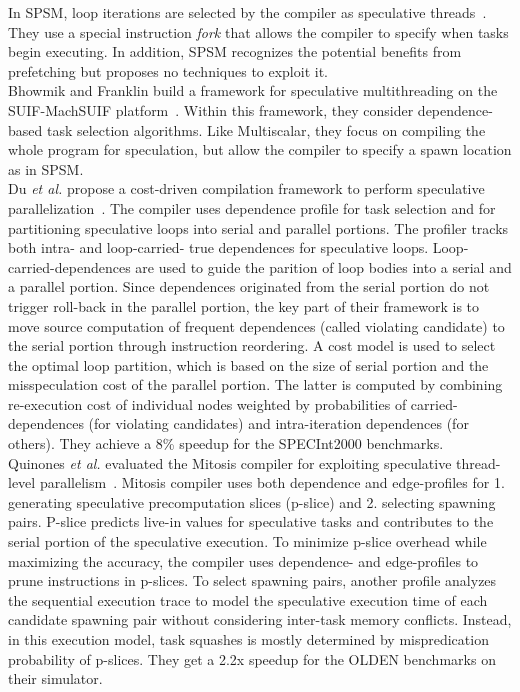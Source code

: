 \documentclass[10pt]{report}          %
\begin{document}
In SPSM, loop iterations are selected by the compiler as speculative threads~\cite{SPSM}. They use a special instruction \textit{fork} that allows the compiler to specify when tasks begin executing. In addition, SPSM recognizes the potential benefits from prefetching but proposes no techniques to exploit it. \\
Bhowmik and Franklin build a framework for speculative multithreading on the SUIF-MachSUIF platform~\cite{bhowmik}. Within this framework, they consider dependence-based task selection algorithms. Like Multiscalar, they focus on compiling the whole program for speculation, but allow the compiler to specify a spawn
location as in SPSM.\\
Du \textit{et al.} propose a cost-driven compilation framework to perform speculative parallelization~\cite{du_spec}. The compiler uses dependence profile for task selection and for partitioning speculative loops into serial and parallel portions. The profiler tracks both intra- and loop-carried- true dependences for speculative loops. Loop-carried-dependences are used to guide the parition of loop bodies into a serial and a parallel portion. Since dependences originated from the serial portion do not trigger roll-back in the parallel portion, the key part of their framework is to move source computation of frequent dependences (called violating candidate) to the serial portion through instruction reordering. A cost model is used to select the optimal loop partition, which is based on the size of serial portion and the misspeculation cost of the parallel portion. The latter is computed by combining re-execution cost of individual nodes weighted by probabilities of carried-dependences (for violating candidates) and intra-iteration dependences (for others).  They achieve a 8\% speedup for the SPECInt2000 benchmarks.\\
Quinones \textit{et al.} evaluated the Mitosis compiler for exploiting speculative thread-level parallelism~\cite{mitosis}.  Mitosis compiler uses both dependence and edge-profiles for 1. generating speculative precomputation slices (p-slice) and 2. selecting spawning pairs. P-slice predicts live-in values for speculative tasks and contributes to the serial portion of the speculative execution. To minimize p-slice overhead while maximizing the accuracy, the compiler uses dependence- and edge-profiles to prune instructions in p-slices. To select spawning pairs, another profile analyzes the sequential execution trace to model the speculative execution time of each candidate spawning pair without considering inter-task memory conflicts. Instead, in this execution model, task squashes is mostly determined by mispredication probability of p-slices. They get a 2.2x speedup for the OLDEN benchmarks on their simulator.\\
\end{document}
